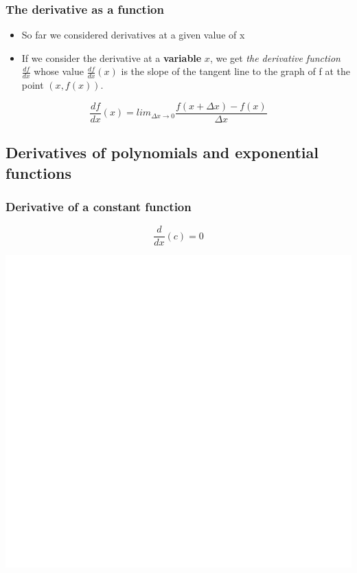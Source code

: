 \documentclass[]{book}
\begin{document}
\hypertarget{the-derivative-as-a-function}{%
\subsubsection{The derivative as a function}\label{the-derivative-as-a-function}}

\begin{itemize}
\item
  So far we considered derivatives at a given value of x
\item
  If we consider the derivative at a \textbf{variable} \(x\), we get \emph{the derivative function} \(\frac{df}{dx}\) whose value \(\frac{df}{dx}(x)\) is the slope of the tangent line to the graph of f at the point \((x, f(x)).\)
\end{itemize}

\[\frac{df}{dx}(x) =lim_{\Delta x\to 0}\frac{f(x+\Delta x) -f(x)}{\Delta x}\]

\hypertarget{derivatives-of-polynomials-and-exponential-functions}{%
\subsection{Derivatives of polynomials and exponential functions}\label{derivatives-of-polynomials-and-exponential-functions}}

\hypertarget{derivative-of-a-constant-function}{%
\subsubsection{Derivative of a constant function}\label{derivative-of-a-constant-function}}

\[\frac{d}{dx}(c) = 0\]

\begin{center}\includegraphics[width=1\linewidth]{figure/LB2-1} \end{center}
\end{document}
